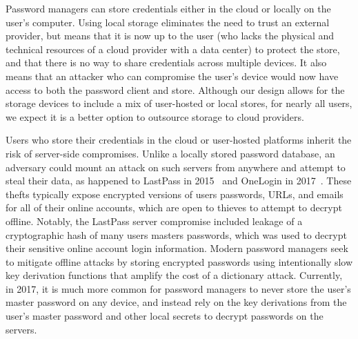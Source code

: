 




 \label{password_storage_vulnerability}
Password managers can store credentials either in the cloud or locally on the user's computer. Using local storage eliminates the need to trust an external provider, but means that it is now up to the user (who lacks the physical and technical resources of a cloud provider with a data center) to protect the store, and that there is no way to share credentials across multiple devices.  It also means that an attacker who can compromise the user's device would now have access to both the password client and store.  Although our design allows for the storage devices to include a mix of user-hosted or local stores, for nearly all users, we expect it is a better option to outsource storage to cloud providers.

Users who store their credentials in the cloud or user-hosted platforms inherit the risk of server-side compromises. Unlike a locally stored password database, an adversary could mount an attack on such servers from anywhere and attempt to steal their data, as happened to LastPass in 2015~\cite{lastpasshack} and OneLogin in 2017~\cite{onelogin}. These thefts typically expose encrypted versions of users passwords, URLs, and emails for all of their online accounts, which are open to thieves to attempt to decrypt offline. Notably, the LastPass server compromise included leakage of a cryptographic hash of many users masters passwords, which was used to decrypt their sensitive online account login information. Modern password managers seek to mitigate offline attacks by storing encrypted passwords using intentionally slow key derivation functions that amplify the cost of a dictionary attack.  Currently, in 2017, it is much more common for password managers to never store the user's master password on any device, and instead rely on the key derivations from the user's master password and other local secrets to decrypt passwords on the servers. %

